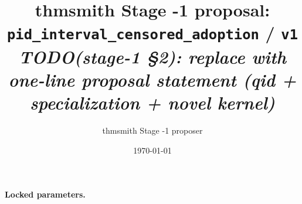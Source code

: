 \documentclass[11pt]{article}
\title{thmsmith Stage -1 proposal: \texttt{pid\_interval\_censored\_adoption} / \texttt{v1}%
  \\ \large\textit{TODO(stage-1 \S2): replace with one-line proposal statement (qid + specialization + novel kernel)}}
\author{thmsmith Stage -1 proposer}
\date{\today}
\theoremstyle{definition}
\theoremstyle{plain}
\theoremstyle{remark}
\begin{document}
\maketitle


\paragraph{Locked parameters.}

\begin{abstract}
\end{abstract}
\end{document}
